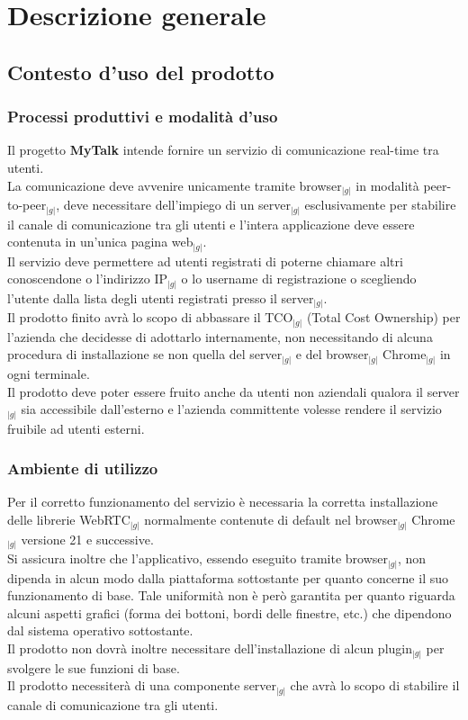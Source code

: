 \section{Descrizione generale}
	\subsection{Contesto d'uso del prodotto}
		\subsubsection{Processi produttivi e modalità d'uso}
		Il progetto \textbf{MyTalk} intende fornire un servizio di comunicazione real-time tra utenti.\\
		La comunicazione deve avvenire unicamente tramite browser$_{|g|}$ in modalità peer-to-peer$_{|g|}$, deve necessitare 
		dell'impiego di un server$_{|g|}$ esclusivamente per stabilire il canale di comunicazione tra gli utenti e l'intera applicazione deve essere contenuta in un'unica pagina web$_{|g|}$.\\
		Il servizio deve permettere ad utenti registrati di poterne chiamare altri conoscendone o l'indirizzo IP$_{|g|}$ o lo username di registrazione o scegliendo l'utente dalla lista degli utenti registrati presso il server$_{|g|}$.\\
		Il prodotto finito avrà lo scopo di abbassare il TCO$_{|g|}$ (Total Cost Ownership) per l'azienda che decidesse di adottarlo internamente, non necessitando di alcuna procedura di installazione se non quella del server$_{|g|}$ e del browser$_{|g|}$ Chrome$_{|g|}$ in ogni terminale.\\
		Il prodotto deve poter essere fruito anche da utenti non aziendali qualora il server$_{|g|}$ sia accessibile dall'esterno e l'azienda committente volesse rendere il servizio fruibile ad utenti esterni.

		\subsubsection{Ambiente di utilizzo}
			Per il corretto funzionamento del servizio è necessaria la corretta installazione delle librerie WebRTC$_{|g|}$ normalmente contenute di default nel browser$_{|g|}$ Chrome$_{|g|}$ versione 21 e successive.\\
			Si assicura inoltre che l'applicativo, essendo eseguito tramite browser$_{|g|}$, non dipenda in alcun modo dalla 
			piattaforma sottostante per quanto concerne il suo funzionamento di base. Tale uniformità non è però garantita per 
			quanto riguarda alcuni aspetti grafici (forma dei bottoni, bordi delle finestre, etc.) che dipendono dal sistema operativo 
			sottostante.\\
			Il prodotto non dovrà inoltre necessitare dell'installazione di alcun plugin$_{|g|}$ per svolgere le sue funzioni di base.\\
			Il prodotto necessiterà di una componente server$_{|g|}$ che avrà lo scopo di stabilire il canale di comunicazione tra gli utenti.
